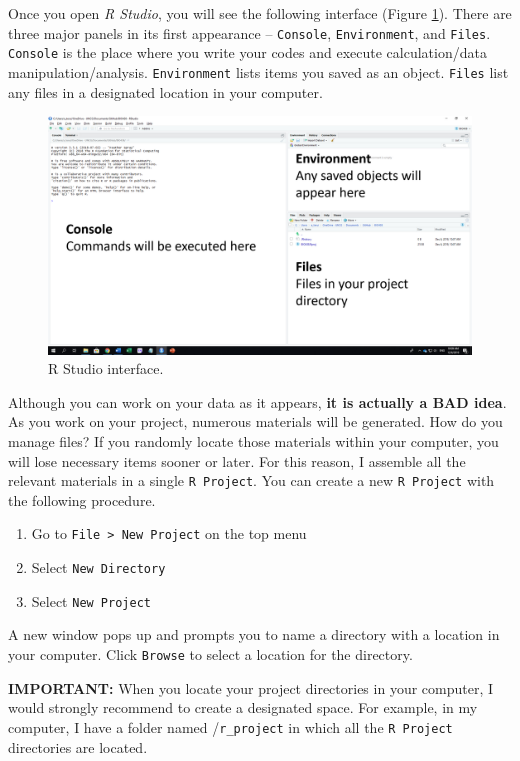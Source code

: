 \documentclass[
]{book}
\providecommand{\tightlist}{%
  \setlength{\itemsep}{0pt}\setlength{\parskip}{0pt}}
\begin{document}
Once you open \emph{R Studio}, you will see the following interface (Figure \ref{fig:ui}). There are three major panels in its first appearance -- \texttt{Console}, \texttt{Environment}, and \texttt{Files}. \texttt{Console} is the place where you write your codes and execute calculation/data manipulation/analysis. \texttt{Environment} lists items you saved as an object. \texttt{Files} list any files in a designated location in your computer.

\begin{figure}
\includegraphics[width=27.78in]{image/r_image01} \caption{R Studio interface.}\label{fig:ui}
\end{figure}

Although you can work on your data as it appears, \textbf{it is actually a BAD idea}. As you work on your project, numerous materials will be generated. How do you manage files? If you randomly locate those materials within your computer, you will lose necessary items sooner or later. For this reason, I assemble all the relevant materials in a single \texttt{R\ Project}. You can create a new \texttt{R\ Project} with the following procedure.

\begin{enumerate}
\def\labelenumi{\alph{enumi}.}
\tightlist
\item
  Go to \texttt{File\ \textgreater{}\ New\ Project} on the top menu
\item
  Select \texttt{New\ Directory}
\item
  Select \texttt{New\ Project}
\end{enumerate}

A new window pops up and prompts you to name a directory with a location in your computer. Click \texttt{Browse} to select a location for the directory.

\textbf{IMPORTANT:} When you locate your project directories in your computer, I would strongly recommend to create a designated space. For example, in my computer, I have a folder named /\texttt{r\_project} in which all the \texttt{R\ Project} directories are located.
\end{document}
